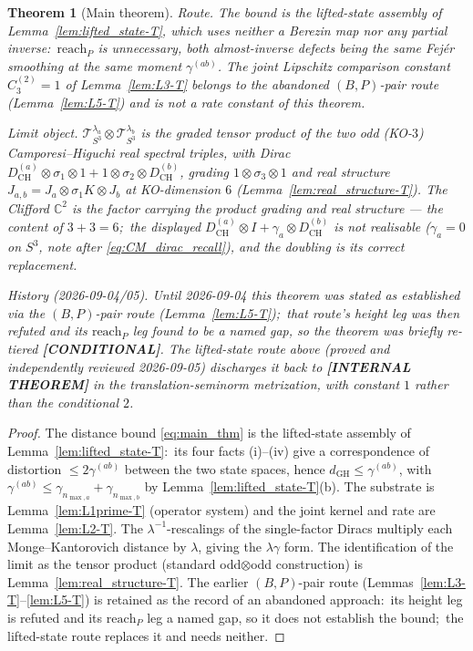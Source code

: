 \documentclass[11pt,a4paper]{article}
\theoremstyle{plain}
\newtheorem{theorem}{Theorem}[section]
\theoremstyle{definition}
\newcommand{\nmaxa}{n_{\max,a}}
\newcommand{\nmaxb}{n_{\max,b}}
\newcommand{\sthree}{S^{3}}
\newcommand{\Tcal}{\mathcal{T}}
\newcommand{\C}{\mathbb{C}}
\newcommand{\DCH}{D_{\mathrm{CH}}}
\begin{document}
\begin{theorem}[Main theorem]
\emph{Route.} The bound is the lifted-state assembly of
Lemma~\ref{lem:lifted_state-T}, which uses neither a Berezin map nor any
partial inverse:\ $\mathrm{reach}_P$ is \emph{unnecessary}, both
almost-inverse defects being the same Fej\'er smoothing at the same
moment $\gamma^{(ab)}$. The joint Lipschitz comparison constant
$C_3^{(2)} = 1$ of Lemma~\ref{lem:L3-T} belongs to the
\emph{abandoned} $(B,P)$-pair route (Lemma~\ref{lem:L5-T}) and is not a
rate constant of this theorem.

\emph{Limit object.} $\Tcal_{\sthree}^{\lambda_a} \otimes
\Tcal_{\sthree}^{\lambda_b}$ is the graded tensor
product of the two odd (KO-$3$) Camporesi--Higuchi real spectral triples,
with Dirac $\DCH^{(a)}\otimes\sigma_1\otimes 1 +
1\otimes\sigma_2\otimes\DCH^{(b)}$, grading $1\otimes\sigma_3\otimes 1$
and real structure $J_{a,b} = J_a\otimes\sigma_1 K\otimes J_b$ at
KO-dimension $6$ (Lemma~\ref{lem:real_structure-T}). The Clifford $\C^2$
is the factor carrying the product grading and real structure --- the
content of $3+3=6$;\ the displayed
$\DCH^{(a)}\otimes I + \gamma_a\otimes\DCH^{(b)}$ is \emph{not} realisable
($\gamma_a = 0$ on $\sthree$, note after \eqref{eq:CM_dirac_recall}), and
the doubling is its correct replacement.

\emph{History (2026-09-04/05).} Until 2026-09-04 this theorem was stated
as established via the $(B,P)$-pair route (Lemma~\ref{lem:L5-T});\ that
route's height leg was then refuted and its $\mathrm{reach}_P$ leg found
to be a named gap, so the theorem was briefly re-tiered
\textbf{[CONDITIONAL]}. The lifted-state route above (proved and
independently reviewed 2026-09-05) discharges it back to
\textbf{[INTERNAL THEOREM]} in the translation-seminorm metrization, with
constant $1$ rather than the conditional $2$.
\end{theorem}

\begin{proof}
The distance bound \eqref{eq:main_thm} is the lifted-state assembly of
Lemma~\ref{lem:lifted_state-T}:\ its four facts (i)--(iv) give a
correspondence of distortion $\le 2\gamma^{(ab)}$ between the two state
spaces, hence $d_{\mathrm{GH}} \le \gamma^{(ab)}$, with $\gamma^{(ab)} \le
\gamma_{\nmaxa} + \gamma_{\nmaxb}$ by Lemma~\ref{lem:lifted_state-T}(b).
The substrate is Lemma~\ref{lem:L1prime-T} (operator system) and the
joint kernel and rate are Lemma~\ref{lem:L2-T}. The
$\lambda^{-1}$-rescalings of the single-factor Diracs multiply each
Monge--Kantorovich distance by $\lambda$, giving the $\lambda\gamma$ form.
The identification of the limit as the tensor
product (standard odd$\otimes$odd construction) is Lemma~\ref{lem:real_structure-T}. The earlier $(B,P)$-pair
route (Lemmas~\ref{lem:L3-T}--\ref{lem:L5-T}) is retained as the record
of an abandoned approach:\ its height leg is refuted and its
$\mathrm{reach}_P$ leg a named gap, so it does not establish the bound;\
the lifted-state route replaces it and needs neither.
\end{proof}
\end{document}
